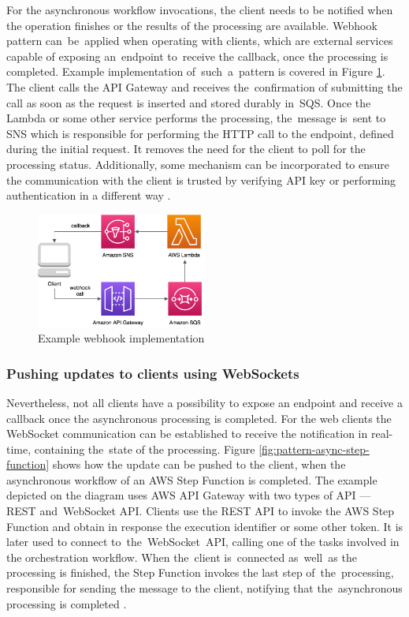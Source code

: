 For the asynchronous workflow invocations, the client needs to be notified when the operation finishes or the results of the processing are available.
Webhook pattern can~be~applied when operating with clients, which are external services capable of exposing an~endpoint to~receive the callback, once the processing is completed.
Example implementation of~such~a~pattern is covered in Figure \ref{fig:pattern-webhook}.
The client calls the API Gateway and receives the~confirmation of submitting the call as soon as the request is inserted and stored durably in~SQS.
Once the Lambda or some other service performs the processing, the~message is~sent to SNS which is responsible for performing the HTTP call to the endpoint, defined during the initial request.
It removes the need for the client to poll for the processing status.
Additionally, some mechanism can be incorporated to ensure the communication with the client is trusted by verifying API key or performing authentication in a different way \cite{ServerlessAtScaleDesignPatternsAndOptimizations}.

\begin{figure}[h]
   \centering
   \includegraphics[width=0.5\textwidth]{assets/04-serverless-for-web-apps/webhook.png}
   \caption{Example webhook implementation}
   \label{fig:pattern-webhook}
\end{figure}

\subsubsection{Pushing updates to clients using WebSockets} \label{chapter:client-websockets}

Nevertheless, not all clients have a possibility to expose an endpoint and receive a callback once the asynchronous processing is completed.
For the web clients the WebSocket communication can be established to receive the notification in real-time, containing the~state of the processing.
Figure \ref{fig:pattern-async-step-function} shows how the update can be pushed to the client, when the asynchronous workflow of an AWS Step Function is completed.
The example depicted on the diagram uses AWS API Gateway with two types of API --- REST and~WebSocket API.
Clients use the REST API to invoke the AWS Step Function and obtain in response the execution identifier or some other token.
It is later used to connect to~the~WebSocket~API, calling one of the tasks involved in the orchestration workflow.
When the~client is~connected as~well~as the processing is finished, the Step Function invokes the last step of~the~processing, responsible for sending the message to the client, notifying that the~asynchronous processing is completed \cite{ServerlessAtScaleDesignPatternsAndOptimizations}.

